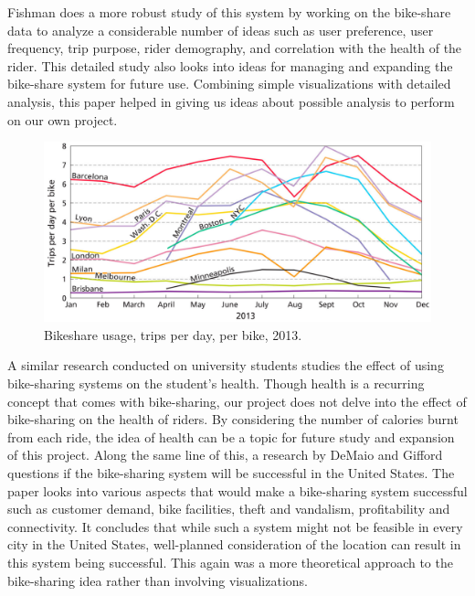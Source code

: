Fishman does a more robust study of this system \cite{Fishman:2016:BikeShare} by working on the bike-share data to analyze a considerable number of ideas such as user preference, user frequency, trip purpose, rider demography, and correlation with the health of the rider. This detailed study also looks into ideas for managing and expanding the bike-share system for future use. Combining simple visualizations with detailed analysis, this paper helped in giving us ideas about possible analysis to perform on our own project. 
\begin{figure}[h]
	\centering %
	\includegraphics[scale=0.25]{figs/bikeshare_lit1.PNG}
	\caption{\footnotesize{Bikeshare usage, trips per day, per bike, 2013. \cite{Fishman:2016:BikeShare}}}
	\label{fig:Line Chart}
	\captionsetup{justification=centering,margin=1cm}
	\vspace{-10pt}
\end{figure}
\newline
A similar research conducted on university students \cite{Garcia:2015:Univ} studies the effect of using bike-sharing systems on the student's health. Though health is a recurring concept that comes with bike-sharing, our project does not delve into the effect of bike-sharing on the health of riders. By considering the number of calories burnt from each ride, the idea of health can be a topic for future study and expansion of this project. Along the same line of this, a research by DeMaio and Gifford \cite{DeMaio:2004:Success} questions if the bike-sharing system will be successful in the United States. The paper looks into various aspects that would make a bike-sharing system successful such as customer demand, bike facilities, theft and vandalism, profitability and connectivity. It concludes that while such a system might not be feasible in every city in the United States, well-planned consideration of the location can result in this system being successful. This again was a more theoretical approach to the bike-sharing idea rather than involving visualizations.


